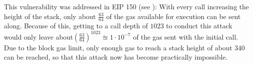 This vulnerability was addressed in EIP 150 (see \cite{ethereum:eip150}): With every call increasing the height of the stack, only about \( \frac{63}{64} \) of the gas available for execution can be sent along. Because of this, getting to a call depth of \( 1023 \) to conduct this attack would only leave  about\( \left( \frac{63}{64} \right)^{1023} \approxeq 1 \cdot 10^{-7} \) of the gas sent with the initial call. Due to the block gas limit, only enough gas to reach a stack height of about \( 340 \) can be reached, so that this attack now has become practically impossible.

